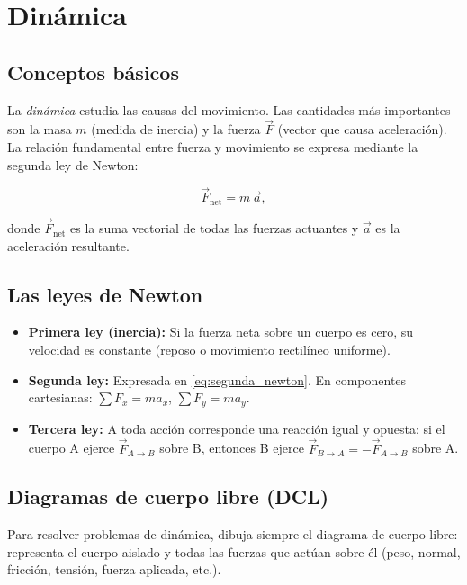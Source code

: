 

\section{Dinámica}
\label{sec:dinamica}


\subsection{Conceptos básicos}
La \emph{dinámica} estudia las causas del movimiento. Las cantidades más importantes son la masa $m$ (medida de inercia) y la fuerza $\vec{F}$ (vector que causa aceleración). La relación fundamental entre fuerza y movimiento se expresa mediante la segunda ley de Newton:


\begin{equation}\label{eq:segunda_newton}
\vec{F}_{\text{net}} = m\,\vec{a},
\end{equation}


donde $\vec{F}_{\text{net}}$ es la suma vectorial de todas las fuerzas actuantes y $\vec{a}$ es la aceleración resultante.


\subsection{Las leyes de Newton}
\begin{itemize}
\item \textbf{Primera ley (inercia):} Si la fuerza neta sobre un cuerpo es cero, su velocidad es constante (reposo o movimiento rectilíneo uniforme).
\item \textbf{Segunda ley:} Expresada en \eqref{eq:segunda_newton}. En componentes cartesianas: $\sum F_x = m a_x$, $\sum F_y = m a_y$.
\item \textbf{Tercera ley:} A toda acción corresponde una reacción igual y opuesta: si el cuerpo A ejerce $\vec{F}_{A\to B}$ sobre B, entonces B ejerce $\vec{F}_{B\to A} = -\vec{F}_{A\to B}$ sobre A.
\end{itemize}


\subsection{Diagramas de cuerpo libre (DCL)}
Para resolver problemas de dinámica, dibuja siempre el diagrama de cuerpo libre: representa el cuerpo aislado y todas las fuerzas que actúan sobre él (peso, normal, fricción, tensión, fuerza aplicada, etc.).


\begin{center}
\end{center}


